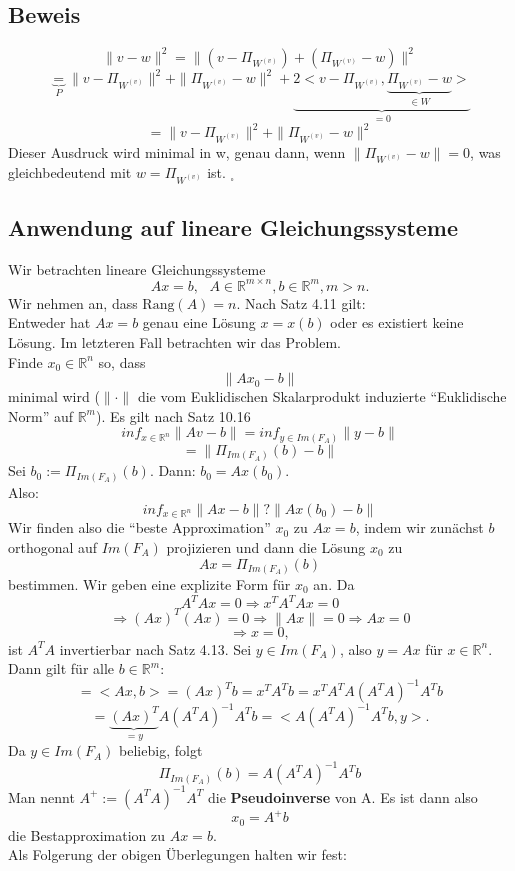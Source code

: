 \documentclass{scrbook}
\begin{document}
\subsection*{Beweis}
\[\|v-w\|^2 = \|(v-\Pi_{W^{(v)}})+(\Pi_{W^{(v)}}-w)\|^2\]
\[\underbrace{=}_{P} \| v-\Pi_{W^{(v)}} \|^2 + \|\Pi_{W^{(v)}} -w\|^2 + \underbrace{2<v-\Pi_{W^{(v)}}, \underbrace{\Pi_{W^{(v)}} -w}_{\in W}>}_{=0}\]
\[
= \| v -\Pi_{W^{(v)}}\|^2 + \|\Pi_{W^{(v)}} -w\|^2
\]
Dieser Ausdruck wird minimal in w, genau dann, wenn $\| \Pi_{W^{(v)}} -w \| = 0$, was gleichbedeutend mit $w = \Pi_{W^{(v)}}$ ist. $_\square$
\subsection*{Anwendung auf lineare Gleichungssysteme}
Wir betrachten lineare Gleichungssysteme
\[Ax = b , \text{ } A\in \mathbb{R}^{m \times n}, b\in \mathbb{R}^m, m>n.\]
Wir nehmen an, dass $\text{Rang}(A)=n$. Nach Satz 4.11 gilt:
\\Entweder hat $Ax = b$ genau eine Lösung $x = x(b)$ oder es existiert keine Lösung. Im letzteren Fall betrachten wir das Problem.
\\Finde $x_0 \in \mathbb{R}^n$ so, dass 
\[\|Ax_0-b\|\]
minimal wird ($\| \cdot \|$ die vom Euklidischen Skalarprodukt induzierte "`Euklidische Norm"' auf $\mathbb{R}^m$). Es gilt nach Satz 10.16
\[inf_{x \in \mathbb{R}^n} \|Av-b\| = inf_{y \in Im(F_A)} \|y-b\|\]
\[
= \| \Pi_{Im(F_A)}(b)-b\|
\]
Sei $b_0 := \Pi_{Im(F_A)}(b)$. Dann: $b_0 = Ax(b_0)$.\\
Also:
\[
inf_{x \in \mathbb{R}^n} \|Ax-b\| ? \|Ax(b_0)-b\|
\]
Wir finden also die "`beste Approximation"' $x_0$ zu $Ax = b$, indem wir zunächst $b$ orthogonal auf $Im(F_A)$ projizieren und dann die Lösung $x_0$ zu
\[Ax = \Pi_{Im(F_A)} (b)\]
bestimmen.
Wir geben eine explizite Form für $x_0$ an. Da
\[
A^TAx = 0 \Rightarrow x^TA^TAx = 0
\]
\[
\Rightarrow (Ax)^T(Ax) = 0 \Rightarrow \|Ax\| = 0 \Rightarrow Ax = 0
\]
\[
\Rightarrow x = 0,
\]
ist $A^TA$ invertierbar nach Satz 4.13. Sei $y \in Im(F_A)$, also $y = Ax$ für $x \in \mathbb{R}^n$. Dann gilt für alle $b \in \mathbb{R}^m$:
\[<b,y> = <Ax,b> = (Ax)^Tb = x^TA^Tb = x^TA^TA(A^TA)^{-1}A^Tb\]
\[=\underbrace{(Ax)^T}_{=y} A(A^TA)^{-1} A^Tb = <A(A^TA)^{-1}A^Tb,y>.\]
Da $y \in Im(F_A)$ beliebig, folgt \[\Pi_{Im(F_A)}(b) = A(A^TA)^{-1}A^Tb\]
Man nennt $A^+ := (A^TA)^{-1}A^T$ die \textbf{Pseudoinverse} von A. Es ist dann also
\[x_0 = A^+b\] die Bestapproximation zu $Ax=b$.\\
Als Folgerung der obigen Überlegungen halten wir fest:
\end{document}
